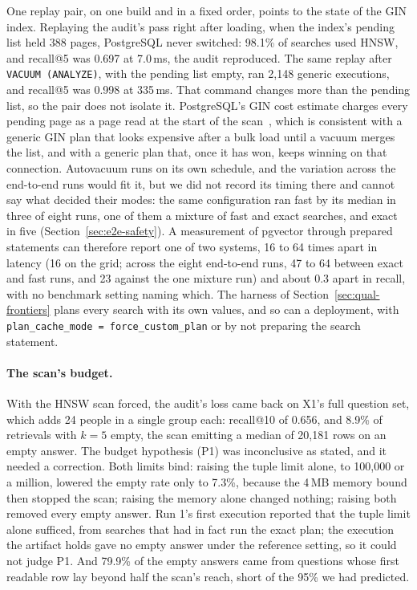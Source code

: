 One replay pair, on one build and in a fixed order, points to the state of the GIN index. Replaying the audit's pass right after loading,
when the index's pending list held 388 pages, PostgreSQL never switched: 98.1\% of searches used
HNSW, and recall@5 was 0.697 at 7.0\,ms, the audit reproduced. The same replay after
\texttt{VACUUM (ANALYZE)}, with the pending list empty, ran 2,148 generic executions, and recall@5 was 0.998 at
335\,ms. That command changes more than the pending list, so the pair does not isolate it. PostgreSQL's GIN cost estimate charges every pending page as a page read at the start of the
scan~\cite{postgresql2026selfuncs}, which is consistent with a generic GIN plan that looks expensive after a bulk load until a vacuum merges the list, and
with a generic plan that, once it has won, keeps winning on that connection. Autovacuum runs on its own
schedule, and the variation across the end-to-end runs would fit it, but we did not record
its timing there and cannot say what decided their modes: the same configuration ran fast by its median in three of eight runs, one of them a
mixture of fast and exact searches, and exact in five (Section~\ref{sec:e2e-safety}). A measurement
of pgvector through prepared statements can therefore
report one of two systems, 16 to 64 times apart in latency (16 on the grid; across the eight end-to-end runs, 47 to 64 between exact and fast runs, and 23 against the one mixture run) and about 0.3 apart in recall, with no benchmark setting naming which.
The harness of Section~\ref{sec:qual-frontiers} plans
every search with its own values, and so can a deployment, with
\texttt{plan\_cache\_mode = force\_custom\_plan} or by not preparing the search statement.

\paragraph{The scan's budget.}
With the HNSW scan forced, the audit's loss came back on X1's full question set, which adds 24
people in a single group each: recall@10 of 0.656, and 8.9\% of retrievals with $k = 5$ empty, the
scan emitting a median of 20,181 rows on an empty answer. The budget hypothesis (P1) was
inconclusive as stated, and it needed a correction. Both limits bind: raising the tuple limit alone,
to 100,000 or a million, lowered the empty rate only to 7.3\%, because the 4\,MB memory bound then
stopped the scan; raising the memory alone changed nothing; raising both removed every empty
answer. Run 1's first execution reported that the tuple limit alone sufficed, from searches that had in
fact run the exact plan; the execution the artifact holds gave no empty answer under the reference setting, so it could not judge P1. And 79.9\% of the empty answers came from questions whose first readable row
lay beyond half the scan's reach, short of the 95\% we had predicted.

